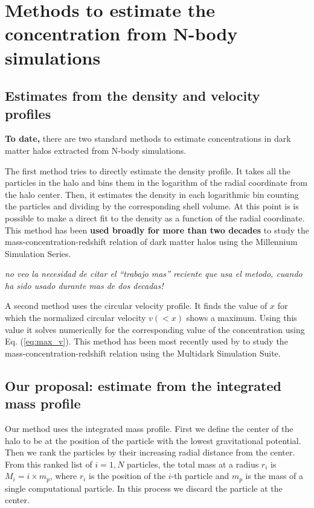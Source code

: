 \documentclass[a4,useAMS,usenatbib,usegraphicx]{mn2e}
\begin{document}
\section{Methods to estimate the concentration from N-body simulations}
\label{sec:method}

\subsection{Estimates from the density and velocity profiles}
{\bf To date,} there are two standard methods to estimate
concentrations in dark matter halos extracted from N-body simulations.

The first method tries to directly estimate the density profile.  It
takes all the particles in the halo and bins them in the logarithm of
the radial coordinate from the halo center.  Then, it estimates the
density in each logarithmic bin counting the particles and dividing by
the corresponding shell volume.  At this point is is possible to make
a direct fit to the density as a function of the radial coordinate.
This method has been {\bf used broadly for more than two decades} to
study the mass-concentration-redshift relation of dark matter halos
using the Millennium Simulation Series.

{\it no veo la necesidad de citar el ``trabajo mas'' reciente que usa
  el metodo, cuando ha sido usado durante mas de dos decadas!}
 
A second method uses the circular velocity profile.  It finds the
value of $x$ for which the normalized circular velocity $v(<x)$ shows
a maximum.  Using this value it solves numerically for the
corresponding value of the concentration using Eq. (\ref{eq:max_v}).
This method has been most recently used by \cite{Klypin2014} to study
the mass-concentration-redshift relation using the Multidark
Simulation Suite.


\subsection{Our proposal: estimate from the integrated mass profile}
Our method uses the integrated mass profile.  First we define the
center of the halo to be at the position of the particle with the
lowest gravitational potential.  Then we rank the particles by their
increasing radial distance from the center.  From this ranked list of
$i=1,N$ particles, the total mass at a radius $r_i$ is $M_i=i\times
m_p$, where $r_i$ is the position of the $i$-th particle and $m_p$ is
the mass of a single computational particle. In this process we
discard the particle at the center.
\end{document}

